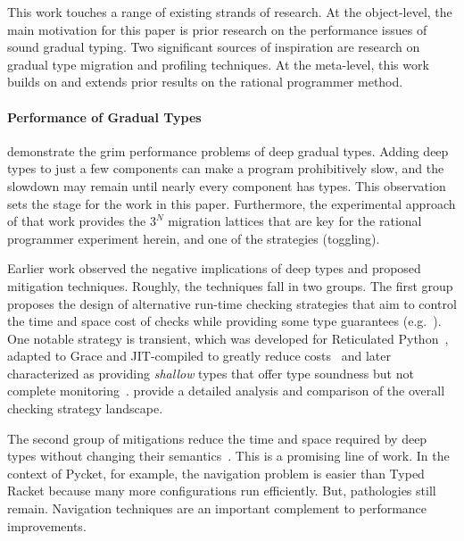 
This work touches a range of existing strands of research. At
the object-level, the main motivation for this paper is prior research on
the performance issues of sound gradual typing.
Two significant
sources of inspiration are research on gradual type migration and
profiling techniques.  At the meta-level, this work builds on and extends
prior results on the rational programmer method.

\paragraph{Performance of Gradual Types} 

\citet{gtnffvf-jfp-2019} demonstrate the grim performance problems of deep
gradual types.
Adding deep types to just a few components can make a program prohibitively
slow, and the slowdown may remain until nearly every component has types.
This observation sets the stage for the work in this paper.
Furthermore, the experimental approach of that work provides the
$3^N$ migration lattices that
are key for the rational programmer experiment herein, and one of the
strategies (toggling).

Earlier work observed the negative implications of deep types
and proposed mitigation techniques.
Roughly, the techniques fall in two groups. The first
group proposes the design of alternative run-time checking strategies that
aim to control the time and space cost of checks while providing
some type guarantees (e.g.~\citep{sgt-esop-2009,rmhn-ecoop-2019,glfd-pj-2022,lgmvpk-pj-2023,g-popl-2015,svctg-esop-2015,rat-oopsla-2017,sfrbcsb-popl-2014,rsfbv-popl-2015,coersion-passing-style}).
One notable strategy is transient, which was developed for Reticulated
Python~\cite{vksb-dls-2014,vss-popl-2017,vsc-dls-2019,v-thesis-2019},
adapted to Grace and JIT-compiled to greatly reduce
costs~\cite{rmhn-ecoop-2019,grmhn-vmil-2019}
and later characterized as providing \emph{shallow} types that offer
type soundness but not complete monitoring~\cite{gfd-oopsla-2019}.
\citet{type-untyped} provide a detailed analysis and comparison of the
overall checking strategy landscape.

The second group of mitigations reduce the time and space required
by deep types without changing their
semantics~\cite{htf-hosc-2010,stw-jfp-2021,stw-pldi-2015,collapsible,corpse-reviver,
kas-pldi-2019, pycket,bbst-oopsla-2017}.
This is a promising line of work.
In the context of Pycket, for example, the navigation problem is easier
than Typed Racket because many more configurations run efficiently.
But, pathologies still remain.
Navigation techniques are an important complement to performance improvements.

